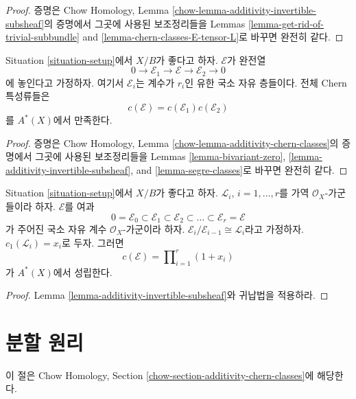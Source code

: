 \begin{proof}
증명은 Chow Homology, Lemma
\ref{chow-lemma-additivity-invertible-subsheaf}의 증명에서 그곳에
사용된 보조정리들을 Lemmas
\ref{lemma-get-rid-of-trivial-subbundle} and
\ref{lemma-chern-classes-E-tensor-L}로 바꾸면 완전히 같다.
\end{proof}

\begin{lemma}
\label{lemma-additivity-chern-classes}
Situation \ref{situation-setup}에서 $X/B$가 좋다고 하자.
$\mathcal{E}$가 완전열
$$
0
\to
\mathcal{E}_1
\to
\mathcal{E}
\to
\mathcal{E}_2
\to
0
$$
에 놓인다고 가정하자. 여기서 $\mathcal{E}_i$는 계수가 $r_i$인
유한 국소 자유 층들이다. 전체 Chern 특성류들은
$$
c(\mathcal{E}) = c(\mathcal{E}_1) c(\mathcal{E}_2)
$$
를 $A^*(X)$에서 만족한다.
\end{lemma}

\begin{proof}
증명은 Chow Homology, Lemma
\ref{chow-lemma-additivity-chern-classes}의 증명에서 그곳에 사용된
보조정리들을 Lemmas
\ref{lemma-bivariant-zero},
\ref{lemma-additivity-invertible-subsheaf}, and
\ref{lemma-segre-classes}로 바꾸면 완전히 같다.
\end{proof}

\begin{lemma}
\label{lemma-chern-filter-by-linebundles}
Situation \ref{situation-setup}에서 $X/B$가 좋다고 하자.
${\mathcal L}_i$, $i = 1, \ldots, r$를 가역
$\mathcal{O}_X$-가군들이라 하자.
$\mathcal{E}$를 여과
$$
0 = \mathcal{E}_0 \subset \mathcal{E}_1 \subset \mathcal{E}_2
\subset \ldots \subset \mathcal{E}_r = \mathcal{E}
$$
가 주어진 국소 자유 계수 $\mathcal{O}_X$-가군이라 하자.
$\mathcal{E}_i/\mathcal{E}_{i - 1} \cong \mathcal{L}_i$라고 가정하자.
$c_1({\mathcal L}_i) = x_i$로 두자. 그러면
$$
c(\mathcal{E})
=
\prod\nolimits_{i = 1}^r (1 + x_i)
$$
가 $A^*(X)$에서 성립한다.
\end{lemma}

\begin{proof}
Lemma \ref{lemma-additivity-invertible-subsheaf}와 귀납법을 적용하라.
\end{proof}

\section{분할 원리}
\label{section-splitting-principle}

\noindent
이 절은 Chow Homology, Section
\ref{chow-section-additivity-chern-classes}에 해당한다.

